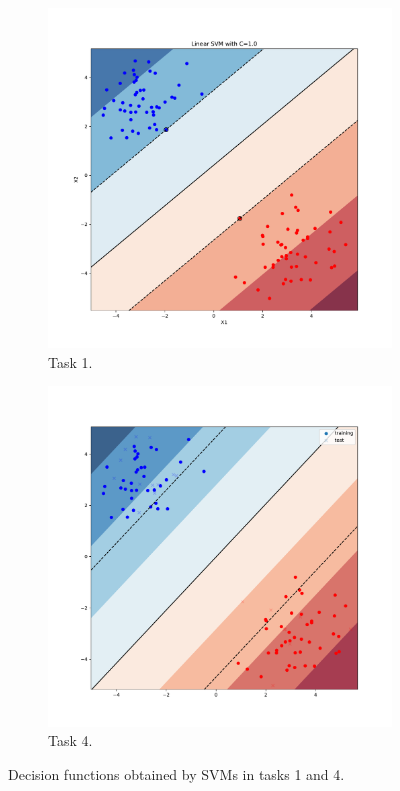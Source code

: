 \documentclass{article}
\begin{document}
\begin{figure}[!ht]
\centering
\begin{subfigure}{0.7\textwidth}
\centering
\includegraphics[width=\textwidth]{./Figures/1a_bound}
\caption{Task 1.}
\end{subfigure}
\begin{subfigure}{0.7\textwidth}
\centering
\includegraphics[width=\textwidth]{./Figures/4_bound}
\caption{Task 4.}
\label{4_4}
\end{subfigure}
\caption{Decision functions obtained by SVMs in tasks 1 and 4.}
\label{4_comp}
\end{figure}
\end{document}
